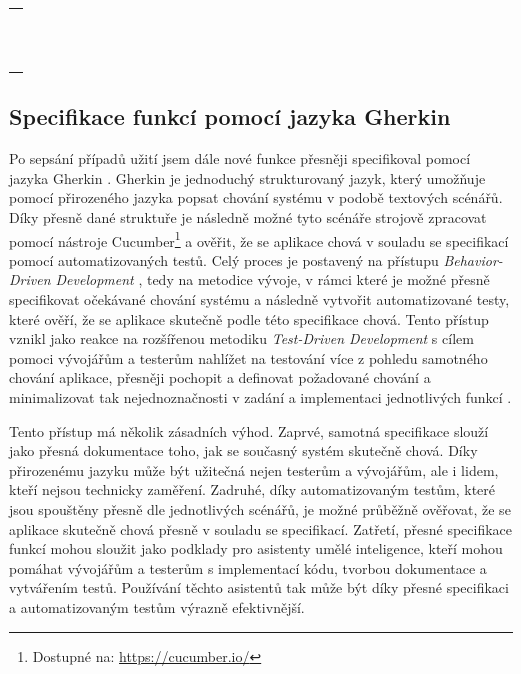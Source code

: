 \begin{longtable}{@{} p{\linewidth} @{}}
    \nameref{sec:uc-34} \\
    \nameref{sec:uc-35} \\
    \nameref{sec:uc-36} \\
    \nameref{sec:uc-37} \\
    \nameref{sec:uc-38} \\
    \nameref{sec:uc-39} \\
    \nameref{sec:uc-40} \\
    \nameref{sec:uc-41} \\
    \nameref{sec:uc-42} \\
    \nameref{sec:uc-43} \\
    \nameref{sec:uc-44} \\
    \nameref{sec:uc-45} \\
    \bottomrule
\end{longtable}

\subsection{Specifikace funkcí pomocí jazyka Gherkin}\label{sec:gherkin-specification}

Po sepsání případů užití jsem dále nové funkce přesněji specifikoval pomocí jazyka Gherkin \cite{CucumberDocs}. Gherkin je jednoduchý strukturovaný jazyk, který umožňuje pomocí přirozeného jazyka popsat chování systému v podobě textových scénářů. Díky přesně dané struktuře je následně možné tyto scénáře strojově zpracovat pomocí nástroje Cucumber\footnote{Dostupné na: \href{https://cucumber.io/}{https://cucumber.io/}} a ověřit, že se aplikace chová v souladu se specifikací pomocí automatizovaných testů. Celý proces je postavený na přístupu \textit{Behavior-Driven Development} \cite{BDD}, tedy na metodice vývoje, v rámci které je možné přesně specifikovat očekávané chování systému a následně vytvořit automatizované testy, které ověří, že se aplikace skutečně podle této specifikace chová. Tento přístup vznikl jako reakce na rozšířenou metodiku \textit{Test-Driven Development} s cílem pomoci vývojářům a testerům nahlížet na testování více z pohledu samotného chování aplikace, přesněji pochopit a definovat požadované chování a minimalizovat tak nejednoznačnosti v zadání a implementaci jednotlivých funkcí \cite{BDDHistory}.

Tento přístup má několik zásadních výhod. Zaprvé, samotná specifikace slouží jako přesná dokumentace toho, jak se současný systém skutečně chová. Díky přirozenému jazyku může být užitečná nejen testerům a vývojářům, ale i lidem, kteří nejsou technicky zaměření. Zadruhé, díky automatizovaným testům, které jsou spouštěny přesně dle jednotlivých scénářů, je možné průběžně ověřovat, že se aplikace skutečně chová přesně v souladu se specifikací. Zatřetí, přesné specifikace funkcí mohou sloužit jako podklady pro asistenty umělé inteligence, kteří mohou pomáhat vývojářům a testerům s implementací kódu, tvorbou dokumentace a vytvářením testů. Používání těchto asistentů tak může být díky přesné specifikaci a automatizovaným testům výrazně efektivnější. \cite{CucumberDocs}

